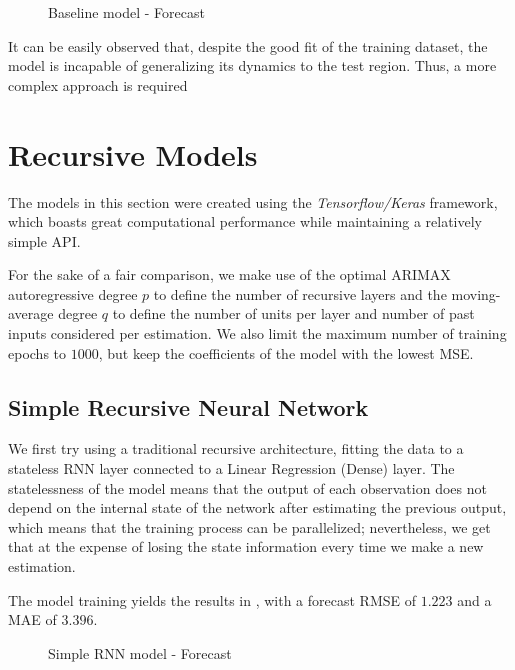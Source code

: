 \documentclass{scrartcl}
\begin{document}
  \begin{figure}[ht]
    \centering
    
    \caption{Baseline model - Forecast}
    \label{fig:baseline_fit}
  \end{figure}

  It can be easily observed that, despite the good fit of the training dataset, the model is incapable of generalizing its dynamics to the test region. Thus, a more complex approach is required

\section{Recursive Models}

  The models in this section were created using the \emph{Tensorflow/Keras} framework, which boasts great computational performance while maintaining a relatively simple API.

  For the sake of a fair comparison, we make use of the optimal ARIMAX autoregressive degree $p$ to define the number of recursive layers and the moving-average degree $q$ to define the number of units per layer and number of past inputs considered per estimation. We also limit the maximum number of training epochs to $1000$, but keep the coefficients of the model with the lowest MSE.

  \subsection{Simple Recursive Neural Network}

    We first try using a traditional recursive architecture, fitting the data to a stateless RNN layer connected to a Linear Regression (Dense) layer. The statelessness of the model means that the output of each observation does not depend on the internal state of the network after estimating the previous output, which means that the training process can be parallelized; nevertheless, we get that at the expense of losing the state information every time we make a new estimation. 

    The model training yields the results in , with a forecast RMSE of $1.223$ and a MAE of $3.396$. 

    \begin{figure}[ht]
      \centering
      
      \caption{Simple RNN model - Forecast}
      \label{fig:rnn_fit}
    \end{figure}
\end{document}
